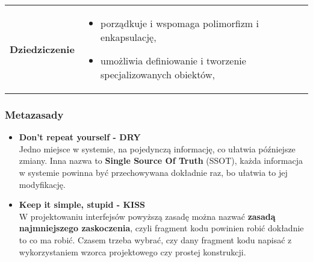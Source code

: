 \documentclass[a4paper]{article}
\begin{document}
\begin{table}[H]
\begin{center}
\begin{tabular}{  p{3cm} p{12cm}  }
                \textbf{Dziedziczenie}
                &
                \begin{itemize}
                    \item porządkuje i wspomaga polimorfizm i enkapsulację,
                    \item umożliwia definiowanie i tworzenie specjalizowanych obiektów,
                \end{itemize}
            \end{tabular}
        \end{center}
    \end{table}

    \subsubsection{Metazasady}
    \begin{itemize}
        \item \textbf{Don't repeat yourself - DRY}\\
        Jedno miejsce w systemie, na pojedynczą informację, co ułatwia późniejsze zmiany.
        Inna nazwa to \textbf{Single Source Of Truth} (SSOT), każda informacja w systemie powinna być przechowywana
        dokładnie raz, bo ułatwia to jej modyfikację.
        \item \textbf{Keep it simple, stupid - KISS}\\
        W projektowaniu interfejsów powyższą zasadę można nazwać \textbf{zasadą najmniejszego zaskoczenia}, czyli
        fragment kodu powinien robić dokładnie to co ma robić. Czasem trzeba wybrać, czy dany fragment kodu
        napisać z wykorzystaniem wzorca projektowego czy prostej konstrukcji.
    \end{itemize}
\end{document}
